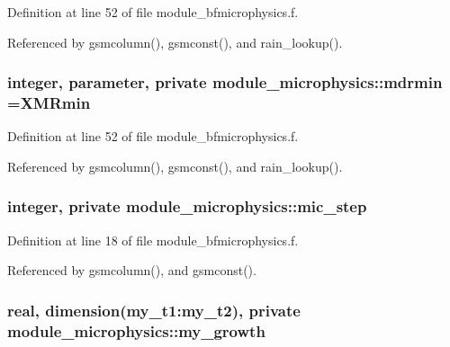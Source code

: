 Definition at line 52 of file module\+\_\+bfmicrophysics.\+f.



Referenced by gsmcolumn(), gsmconst(), and rain\+\_\+lookup().

\subsubsection[{\texorpdfstring{mdrmin}{mdrmin}}]{\setlength{\rightskip}{0pt plus 5cm}integer, parameter, private module\+\_\+microphysics\+::mdrmin =X\+M\+Rmin\hspace{0.3cm}{\ttfamily [private]}}\hypertarget{namespacemodule__microphysics_aa9201f3dba87b517d0fe88af177c4281}{}\label{namespacemodule__microphysics_aa9201f3dba87b517d0fe88af177c4281}


Definition at line 52 of file module\+\_\+bfmicrophysics.\+f.



Referenced by gsmcolumn(), gsmconst(), and rain\+\_\+lookup().

\subsubsection[{\texorpdfstring{mic\+\_\+step}{mic_step}}]{\setlength{\rightskip}{0pt plus 5cm}integer, private module\+\_\+microphysics\+::mic\+\_\+step\hspace{0.3cm}{\ttfamily [private]}}\hypertarget{namespacemodule__microphysics_acb3899d31d6f2079a2d41c3e551e3443}{}\label{namespacemodule__microphysics_acb3899d31d6f2079a2d41c3e551e3443}


Definition at line 18 of file module\+\_\+bfmicrophysics.\+f.



Referenced by gsmcolumn(), and gsmconst().

\subsubsection[{\texorpdfstring{my\+\_\+growth}{my_growth}}]{\setlength{\rightskip}{0pt plus 5cm}real, dimension(my\+\_\+t1\+:my\+\_\+t2), private module\+\_\+microphysics\+::my\+\_\+growth\hspace{0.3cm}{\ttfamily [private]}}\hypertarget{namespacemodule__microphysics_a05041f6bd94be58f8b3bddac6b374b41}{}\label{namespacemodule__microphysics_a05041f6bd94be58f8b3bddac6b374b41}


